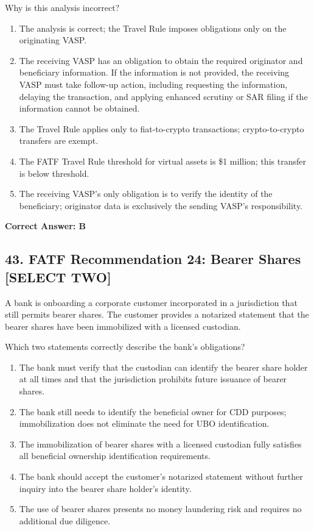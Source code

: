 \documentclass[11pt,a4paper]{article}
\begin{document}
	Why is this analysis incorrect?
	
	\begin{enumerate}[label=\Alph*.]
		\item The analysis is correct; the Travel Rule imposes obligations only on the originating VASP.
		\item The receiving VASP has an obligation to obtain the required originator and beneficiary information. If the information is not provided, the receiving VASP must take follow-up action, including requesting the information, delaying the transaction, and applying enhanced scrutiny or SAR filing if the information cannot be obtained.
		\item The Travel Rule applies only to fiat-to-crypto transactions; crypto-to-crypto transfers are exempt.
		\item The FATF Travel Rule threshold for virtual assets is \$1 million; this transfer is below threshold.
		\item The receiving VASP's only obligation is to verify the identity of the beneficiary; originator data is exclusively the sending VASP's responsibility.
	\end{enumerate}
	
	\textbf{Correct Answer: B}
	
	\subsection{43. FATF Recommendation 24: Bearer Shares \textnormal{[SELECT TWO]}}
	
	A bank is onboarding a corporate customer incorporated in a jurisdiction that still permits bearer shares. The customer provides a notarized statement that the bearer shares have been immobilized with a licensed custodian.
	
	Which two statements correctly describe the bank's obligations?
	
	\begin{enumerate}[label=\Alph*.]
		\item The bank must verify that the custodian can identify the bearer share holder at all times and that the jurisdiction prohibits future issuance of bearer shares.
		\item The bank still needs to identify the beneficial owner for CDD purposes; immobilization does not eliminate the need for UBO identification.
		\item The immobilization of bearer shares with a licensed custodian fully satisfies all beneficial ownership identification requirements.
		\item The bank should accept the customer's notarized statement without further inquiry into the bearer share holder's identity.
		\item The use of bearer shares presents no money laundering risk and requires no additional due diligence.
	\end{enumerate}
	
\end{document}
